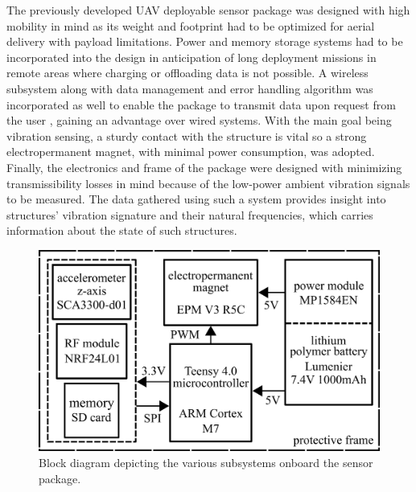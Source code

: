 \documentclass[]{spie}  %
\begin{document}
The previously developed UAV deployable sensor package was designed with high mobility in mind as its weight and footprint had to be optimized for aerial delivery with payload limitations. Power and memory storage systems had to be incorporated into the design in anticipation of long deployment missions in remote areas where charging or offloading data is not possible. A wireless subsystem along with data management and error handling algorithm was incorporated as well to enable the package to transmit data upon request from the user \cite{Sim2013}, gaining an advantage over wired systems.  With the main goal being vibration sensing, a sturdy contact with the structure is vital so a strong electropermanent magnet, with minimal power consumption, was adopted. Finally, the electronics and frame of the package were designed with minimizing transmissibility losses in mind because of the low-power ambient vibration signals to be measured. The data gathered using such a system provides insight into structures' vibration signature and their natural frequencies, which carries information about the state of such structures\cite{Filippo2016}.  
	
	\begin{figure} [H]
		\centering
		\includegraphics[width=4.66 in]{figures/SPIE Package Schematic.png}
		\caption{Block diagram depicting the various subsystems onboard the sensor package.}
		\label{fig:SPIE Package Schematic} 
	\end{figure} 	
	
\end{document}
